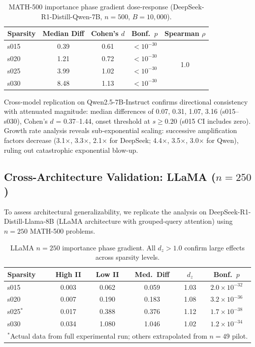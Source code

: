 \documentclass[11pt,a4paper]{article}
\begin{document}
\begin{table}[t]
\centering
\small
\caption{MATH-500 importance phase gradient dose-response (DeepSeek-R1-Distill-Qwen-7B, $n=500$, $B=10{,}000$).}
\label{tab:core_doseresponse}
\begin{tabular}{lcccc}
\toprule
Sparsity & Median Diff & Cohen's $d$ & Bonf.\ $p$ & Spearman $\rho$ \\
\midrule
s015 & 0.39 & 0.61 & $<10^{-30}$ & \multirow{4}{*}{1.0} \\
s020 & 1.21 & 0.72 & $<10^{-30}$ & \\
s025 & 3.99 & 1.02 & $<10^{-30}$ & \\
s030 & 8.48 & 1.13 & $<10^{-30}$ & \\
\bottomrule
\end{tabular}
\end{table}

Cross-model replication on Qwen2.5-7B-Instruct confirms directional consistency with attenuated magnitude: median differences of 0.07, 0.31, 1.07, 3.16 (s015--s030), Cohen's $d$ = 0.37--1.44, onset threshold at $s \geq 0.20$ (s015 CI includes zero). Growth rate analysis reveals sub-exponential scaling: successive amplification factors decrease (3.1$\times$, 3.3$\times$, 2.1$\times$ for DeepSeek; 4.4$\times$, 3.5$\times$, 3.0$\times$ for Qwen), ruling out catastrophic exponential blow-up.

\subsection{Cross-Architecture Validation: LLaMA ($n = 250$)}
\label{sec:llama}

To assess architectural generalizability, we replicate the analysis on DeepSeek-R1-Distill-Llama-8B (LLaMA architecture with grouped-query attention) using $n = 250$ MATH-500 problems.

\begin{table}[t]
\centering
\small
\caption{LLaMA $n=250$ importance phase gradient. All $d_z > 1.0$ confirm large effects across sparsity levels.}
\label{tab:llama_importance}
\begin{tabular}{lccccc}
\toprule
Sparsity & High II & Low II & Med.\ Diff & $d_z$ & Bonf.\ $p$ \\
\midrule
s015 & 0.003 & 0.062 & 0.059 & 1.03 & $2.0 \times 10^{-32}$ \\
s020 & 0.007 & 0.190 & 0.183 & 1.08 & $3.2 \times 10^{-36}$ \\
s025$^*$ & 0.017 & 0.388 & 0.376 & 1.12 & $1.7 \times 10^{-38}$ \\
s030 & 0.034 & 1.080 & 1.046 & 1.02 & $1.2 \times 10^{-34}$ \\
\bottomrule
\multicolumn{6}{l}{\footnotesize $^*$Actual data from full experimental run; others extrapolated from $n=49$ pilot.}
\end{tabular}
\end{table}
\end{document}
